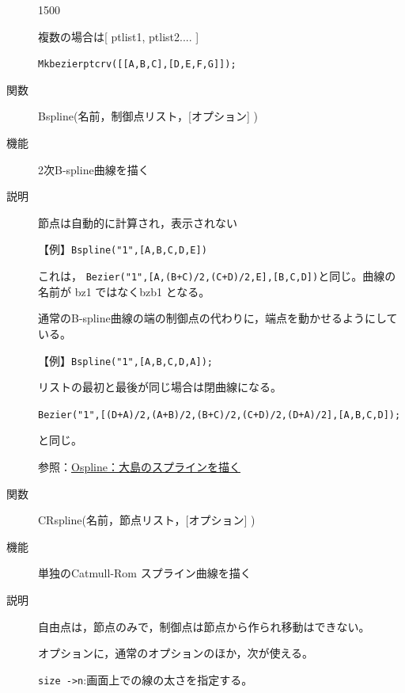 \documentclass[papersize,a4paper,10pt,uplatex]{jsarticle}
\begin{document}
\begin{description}
\begin{layer}{150}{0}
\end{layer}

複数の場合は[ ptlist1, ptlist2.... ]

\verb|Mkbezierptcrv([[A,B,C],[D,E,F,G]]);|

\vspace{40mm}

 \vspace{\baselineskip}
\hypertarget{bspline}{}
\item[関数]Bspline(名前，制御点リスト，[オプション] )
\item[機能]2次B-spline曲線を描く
\item[説明]節点は自動的に計算され，表示されない

 \vspace{\baselineskip}
【例】\verb|Bspline("1",[A,B,C,D,E])|

これは， \verb|Bezier("1",[A,(B+C)/2,(C+D)/2,E],[B,C,D])|と同じ。曲線の名前が bz1 ではなくbzb1 となる。

通常のB-spline曲線の端の制御点の代わりに，端点を動かせるようにしている。

\begin{center} \end{center}

【例】\verb|Bspline("1",[A,B,C,D,A]);|

リストの最初と最後が同じ場合は閉曲線になる。

 \verb|Bezier("1",[(D+A)/2,(A+B)/2,(B+C)/2,(C+D)/2,(D+A)/2],[A,B,C,D]);| 
 
 と同じ。

\begin{center} \end{center}

参照：\hyperlink{ospline}{Ospline：大島のスプラインを描く} 

\vspace{\baselineskip}
\hypertarget{crspline}{}
\item[関数]CRspline(名前，節点リスト，[オプション] )
\item[機能]単独のCatmull-Rom スプライン曲線を描く
\item[説明]
自由点は，節点のみで，制御点は節点から作られ移動はできない。

オプションに，通常のオプションのほか，次が使える。

\verb|size ->n|:画面上での線の太さを指定する。


\end{description}
\end{document}
